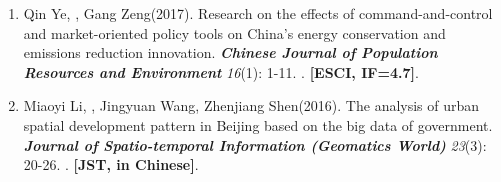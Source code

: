 \begin{enumerate}
    . \textbf{[C journal, CSCD, in Chinese]}.
\item
    Qin Ye, \Shaoqing, Gang Zeng\CS (2017).
	Research on the effects of command-and-control and market-oriented policy tools on China’s energy conservation and emissions reduction innovation.
    \textbf{\textit{Chinese Journal of Population Resources and Environment}} \textit{16}(1): 1-11.
    . \textbf{[ESCI, IF=4.7]}.
\item
    Miaoyi Li, \Shaoqing, Jingyuan Wang, Zhenjiang Shen\CS (2016).
	The analysis of urban spatial development pattern in Beijing based on the big data of government.
    \textbf{\textit{Journal of Spatio-temporal Information (Geomatics World)}} \textit{23}(3): 20-26.
    . \textbf{[JST, in Chinese]}.
\end{enumerate}

